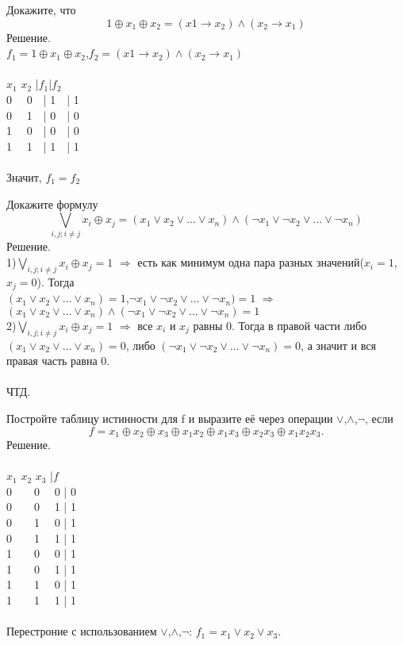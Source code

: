 \begin{exercise}
Докажите, что 
$$1\oplus x_1\oplus x_2=(x1\rightarrow x_2)\wedge(x_2\rightarrow x_1)$$
Решение.\\
$f_1=1\oplus x_1\oplus x_2$,$f_2=(x1\rightarrow x_2)\wedge(x_2\rightarrow x_1)$\\
\\
$x_1$ $x_2$ |$f_1$|$f_2$\\
0 \ \   0\ \ | 1\ \ | 1 \\
0 \ \   1\ \ | 0\ \ | 0\\
1 \ \   0\ \ | 0\ \ | 0\\
1 \ \   1\ \ | 1\ \ |  1\\
\\
Значит, $f_1=f_2$
\end{exercise}

\begin{exercise}
Докажите формулу
$$\bigvee_{i,j;i\neq j} x_i\oplus x_j=(x_1\vee x_2\vee ...\vee x_n)\wedge(\neg x_1\vee \neg x_2\vee ...\vee \neg x_n)$$
Решение.\\
1)$\bigvee_{i,j;i\neq j} x_i\oplus x_j=1$ $\Rightarrow$ есть как минимум одна пара разных значений($x_i=1$,$x_j=0$). Тогда\\
$(x_1\vee x_2\vee ...\vee x_n)=1$,$\neg x_1\vee \neg x_2\vee ...\vee \neg x_n)=1$ $\Rightarrow$ $(x_1\vee x_2\vee ...\vee x_n)\wedge(\neg x_1\vee \neg x_2\vee ...\vee \neg x_n)=1$\\
2)$\bigvee_{i,j;i\neq j} x_i\oplus x_j=1$ $\Rightarrow$ все $x_i$ и $x_j$ равны 0. Тогда в правой части либо $(x_1\vee x_2\vee ...\vee x_n)=0$, либо $(\neg x_1\vee \neg x_2\vee ...\vee \neg x_n)=0$, а значит и вся правая часть равна 0.\\
\\
ЧТД.
\end{exercise}

\begin{exercise}
Постройте таблицу истинности для f и выразите её через операции $\vee$,$\wedge$,$\neg$, если
$$f=x_1\oplus x_2\oplus x_3\oplus x_1x_2\oplus x_1x_3\oplus x_2x_3\oplus x_1x_2x_3.$$
Решение.\\
\\
$x_1$ $x_2$ $x_3$ |$f$\\
0\ \ \ \  0 \ \   0 | 0\\
0\ \ \ \  0 \ \   1 | 1\\
0\ \ \ \  1 \ \   0 | 1\\
0\ \ \ \  1 \ \   1 | 1\\
1\ \ \ \  0 \ \   0 | 1\\
1\ \ \ \  0 \ \   1 | 1\\
1\ \ \ \  1 \ \   0 | 1\\
1\ \ \ \  1 \ \   1 | 1\\
\\
Перестроние с использованием  $\vee$,$\wedge$,$\neg$: $f_1=x_1\vee x_2\vee x_3$.


\end{exercise}
